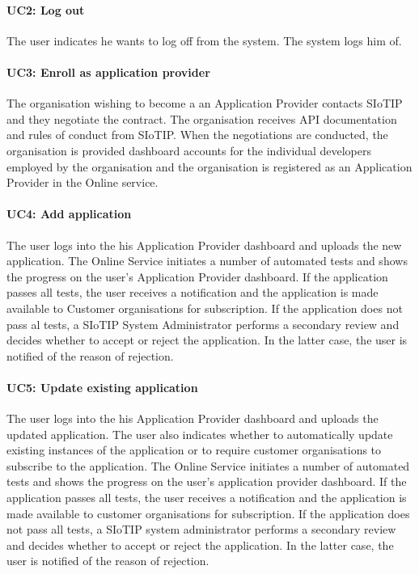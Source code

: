 \documentclass[english]{sareport}
\begin{document}
\paragraph{UC2: Log out}
The user indicates he wants to log off from the system.
The system logs him of.

\paragraph{UC3: Enroll as application provider}
The organisation wishing to become a an Application Provider contacts SIoTIP and they negotiate the contract. The organisation receives API documentation and rules of conduct from SIoTIP. When the negotiations are conducted, the organisation is provided dashboard accounts for the individual developers employed by the organisation and the organisation is registered as an Application Provider in the Online service.

\paragraph{UC4: Add application}
The user logs into the his Application Provider dashboard and uploads the new application. The Online Service initiates a number of automated tests and shows the progress on the user's Application Provider dashboard. If the application passes all tests, the user receives a notification and the application is made available to Customer organisations for subscription. If the application does not pass al tests, a SIoTIP System Administrator performs a secondary review and decides whether to accept or reject the application. In the latter case, the user is notified of the reason of rejection.

\paragraph{UC5: Update existing application}
The user logs into the his Application Provider dashboard and uploads the updated application. The user also indicates whether to automatically update existing instances of the application or to require customer organisations to subscribe to the application. The Online Service initiates a number of automated tests and shows the progress on the user's application provider dashboard. If the application passes all tests, the user receives a notification and the application is made available to customer organisations for subscription. If the application does not pass all tests, a SIoTIP system administrator performs a secondary review and decides whether to accept or reject the application. In the latter case, the user is notified of the reason of rejection.
\end{document}
